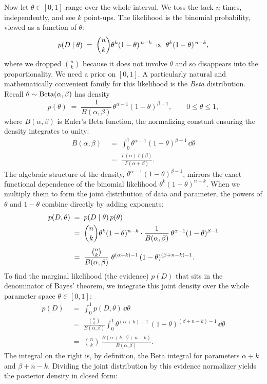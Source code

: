 Now let $\theta \in [0,1]$ range over the whole interval. We toss the tack $n$ times,
independently, and see $k$ point-ups. The likelihood is the binomial probability, viewed
as a function of $\theta$:
\[
  p(D \mid \theta) \;=\; \binom{n}{k}\theta^{k}(1-\theta)^{\,n-k}
  \;\propto\; \theta^{k}(1-\theta)^{\,n-k},
\]
where we dropped $\binom{n}{k}$ because it does not involve $\theta$ and so disappears into
the proportionality. We need a prior on $[0,1]$. A particularly natural and mathematically
convenient family for this likelihood is the \emph{Beta} distribution. Recall
$\theta \sim \operatorname{Beta}(\alpha,\beta)$ has density
\[
  p(\theta) \;=\; \frac{1}{B(\alpha,\beta)}\,\theta^{\alpha-1}(1-\theta)^{\beta-1},
  \qquad 0 \le \theta \le 1,
\]
where $B(\alpha,\beta)$ is Euler's Beta function, the normalizing constant ensuring the density integrates to unity:
\begin{align*}
  B(\alpha,\beta) &\;=\; \int_0^1 \theta^{\alpha-1}(1-\theta)^{\beta-1}\,\dd\theta \\
  &\;=\; \frac{\Gamma(\alpha)\,\Gamma(\beta)}{\Gamma(\alpha+\beta)}.
\end{align*}
The algebraic structure of the density, $\theta^{\alpha-1}(1-\theta)^{\beta-1}$, mirrors the exact functional dependence of the binomial likelihood $\theta^k (1-\theta)^{n-k}$. When we multiply them to form the joint distribution of data and parameter, the powers of $\theta$ and $1-\theta$ combine directly by adding exponents:
\begin{align*}
  p(D, \theta) &\;=\; p(D\mid\theta)\,p(\theta) \\
  &\;=\; \binom{n}{k}\theta^k (1-\theta)^{n-k} \cdot \frac{1}{B(\alpha,\beta)}\,\theta^{\alpha-1}(1-\theta)^{\beta-1} \\[4pt]
  &\;=\; \frac{\binom{n}{k}}{B(\alpha,\beta)}\;\theta^{(\alpha+k)-1}\,(1-\theta)^{(\beta+n-k)-1}.
\end{align*}
To find the marginal likelihood (the evidence) $p(D)$ that sits in the denominator of Bayes' theorem, we integrate this joint density over the whole parameter space $\theta \in [0,1]$:
\begin{align*}
  p(D) &\;=\; \int_0^1 p(D,\theta)\,\dd\theta \\
  &\;=\; \frac{\binom{n}{k}}{B(\alpha,\beta)} \int_0^1 \theta^{(\alpha+k)-1}\,(1-\theta)^{(\beta+n-k)-1}\,\dd\theta \\[4pt]
  &\;=\; \binom{n}{k}\,\frac{B(\alpha+k,\;\beta+n-k)}{B(\alpha,\beta)}.
\end{align*}
The integral on the right is, by definition, the Beta integral for parameters $\alpha+k$ and $\beta+n-k$. Dividing the joint distribution by this evidence normalizer yields the posterior density in closed form:
